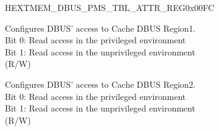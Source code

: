 \begin{register}{H}{EXTMEM\_DBUS\_PMS\_TBL\_ATTR\_REG}{0x00FC}\label{regdesc:EXTMEMDBUSPMSTBLATTRREG}
%
%
%
\regnewline%
\begin{regdesc}\begin{reglist}
\label{fielddesc:EXTMEMDBUSPMSSCT1ATTR}\item [EXTMEM\_DBUS\_PMS\_SCT1\_ATTR] Configures DBUS' access to Cache DBUS Region1. \\
Bit 0: Read access in the privileged environment\\
Bit 1: Read access in the unprivileged environment\\
(R/W)
\label{fielddesc:EXTMEMDBUSPMSSCT2ATTR}\item [EXTMEM\_DBUS\_PMS\_SCT2\_ATTR] Configures DBUS' access to Cache DBUS Region2. \\
Bit 0: Read access in the privileged environment\\
Bit 1: Read access in the unprivileged environment\\
(R/W)
\end{reglist}\end{regdesc}
\end{register}
